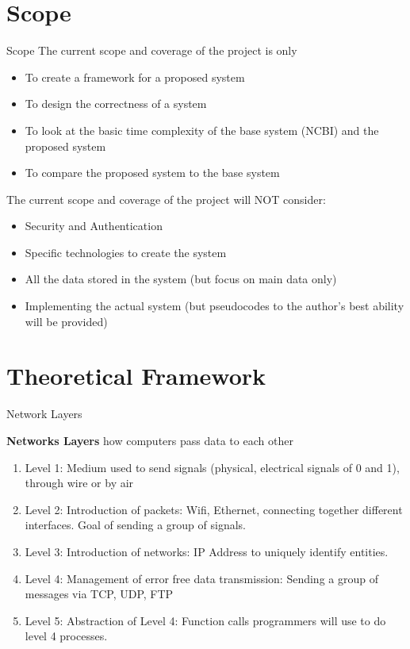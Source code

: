 \documentclass{beamer}
\begin{document}
\section{Scope}
\begin{frame}{Scope}
The current scope and coverage of the project is only
\begin{itemize}
    \item To create a framework for a proposed system
    \item To design the correctness of a system
    \item To look at the basic time complexity of the base system (NCBI) and the proposed system
    \item To compare the proposed system to the base system
\end{itemize}

The current scope and coverage of the project will NOT consider:
\begin{itemize}
    \item Security and Authentication 
    \item Specific technologies to create the system
    \item All the data stored in the system (but focus on main data only)
    \item Implementing the actual system (but pseudocodes to the author's best ability will be provided)
\end{itemize}

\end{frame}


\section{Theoretical Framework}

        \begin{frame}{Network Layers}

         \textbf{Networks Layers} how computers pass data to each other
        \begin{enumerate}
                    \item Level 1: Medium used to send signals (physical, electrical signals of 0 and 1), through wire or by air
                    \item Level 2: Introduction of packets: Wifi, Ethernet, connecting together different interfaces. Goal of sending a group of signals.
                    \item Level 3: Introduction of networks: IP Address to uniquely identify entities.
                    \item Level 4: Management of error free data transmission: Sending a group of messages via TCP, UDP, FTP
                    \item Level 5: Abstraction of Level 4: Function calls programmers will use to do level 4 processes.
        \end{enumerate}
        \end{frame}
    
\end{document}
